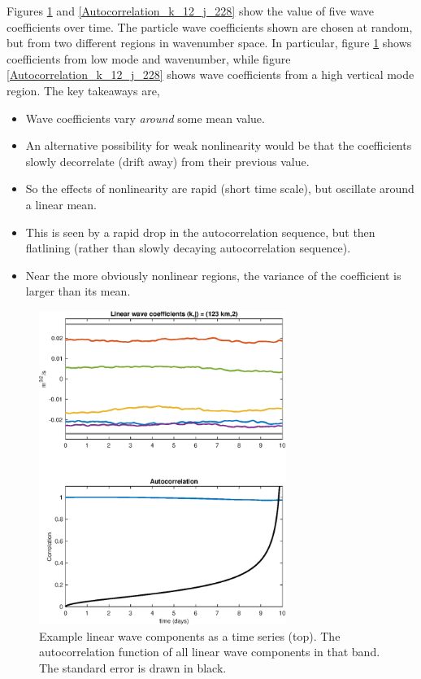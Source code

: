 \documentclass[10pt]{article}
\begin{document}
Figures \ref{Autocorrelation_k_8_j_2} and \ref{Autocorrelation_k_12_j_228} show the value of five wave coefficients over time. The particle wave coefficients shown are chosen at random, but from two different regions in wavenumber space. In particular, figure \ref{Autocorrelation_k_8_j_2} shows coefficients from low mode and wavenumber, while figure  \ref{Autocorrelation_k_12_j_228} shows wave coefficients from a high vertical mode region. The key takeaways are,
\begin{itemize}
    \item Wave coefficients vary \emph{around} some mean value.
    \item An alternative possibility for weak nonlinearity would be that the coefficients slowly decorrelate (drift away) from their previous value.
    \item So the effects of nonlinearity are rapid (short time scale), but oscillate around a linear mean.
    \item This is seen by a rapid drop in the autocorrelation sequence, but then flatlining (rather than slowly decaying autocorrelation sequence).
    \item Near the more obviously nonlinear regions, the variance of the coefficient is larger than its mean.
\end{itemize}

\begin{figure}[t]
  \centerline{\includegraphics[width=19pc,angle=0]{figures/Autocorrelation_k_8_j_2}}
  \caption{Example linear wave components as a time series (top). The autocorrelation function of all linear wave components in that band. The standard error is drawn in black.}
  \label{Autocorrelation_k_8_j_2}
\end{figure}
\end{document}
